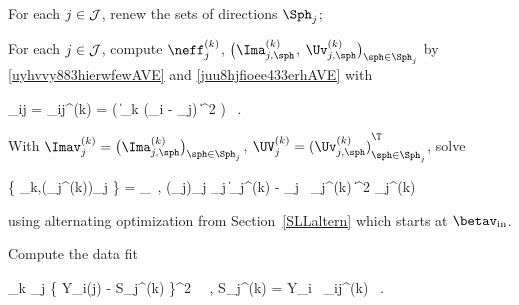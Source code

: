 \begin{mylist}


\item
For each \( j \in \mathcal{J} \), renew the sets of directions \( \Sph_{j} \);

\item 
For each \( j \in \mathcal{J} \), compute 
\( \neff_{j}^{(k)} \), \( \bigl( \Ima_{j,\sph}^{(k)} \), \( \Uv_{j,\sph}^{(k)} \bigr)_{\sph \in \Sph_{j}} \)
by \eqref{uyhvvy883hierwfewAVE} and \eqref{juu8hjfioee433erhAVE} with
\begin{EQA}[c]
	\weight_{ij} 
	= 
	\weight_{ij}^{(k)}
	= 
	\Kern\bigl( \| \TEDR_{k} (\Xv_{i} - \xv_{j}) \|^{2} \bigr) 
	\, .
\end{EQA}

\item 
With 
\( \Imav_{j}^{(k)} = \bigl( \Ima_{j,\sph}^{(k)} \bigr)_{\sph \in \Sph_{j}} \),
\( \UV_{j}^{(k)} = {(\Uv_{j,\sph}^{(k)})}_{\sph \in \Sph_{j}}^{\T} \),
solve
\begin{EQA}[c]
	\bigl\{ \betav_{k},(\fcl_{j}^{(k)})_{j \in \JJJ} \bigr\}
	=
	\arginf_{\betav \, , (\fclv_{j})_{j \in \JJJ}}
	\sum_{j \in \JJJ} \| \Imav_{j}^{(k)} - \fcl_{j} \, \UV_{j}^{(k)} \betav \bigr\|^{2} \neff_{j}^{(k)}
	\, 
	\qquad
\label{jkiiooofytkjhot43d}
\end{EQA}
using alternating optimization from Section~\ref{SLLaltern} which starts at \( \betav_{\init} \).
\item 
Compute the data fit
\begin{EQA}[c]
	\err_{k}
	\eqdef
	\sum_{j \in \JJJ} 
	\bigl\{ Y_{i(j)} - S_{j}^{(k)} \bigr\}^{2} \, 
	\, ,
	\qquad
	S_{j}^{(k)}
	=
	\sumI Y_{i} \, \weight_{ij}^{(k)}
	\, .
	\qquad
\label{jvfujkiiiut5tyerjfdk}
\end{EQA}


\end{mylist}
